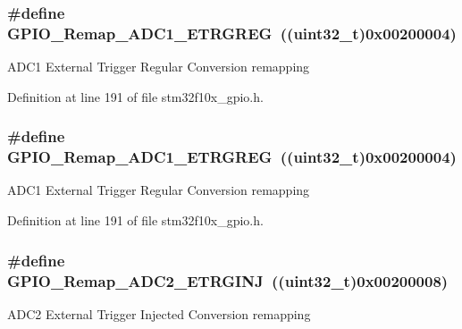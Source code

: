 \subsubsection[{\texorpdfstring{G\+P\+I\+O\+\_\+\+Remap\+\_\+\+A\+D\+C1\+\_\+\+E\+T\+R\+G\+R\+EG}{GPIO_Remap_ADC1_ETRGREG}}]{\setlength{\rightskip}{0pt plus 5cm}\#define G\+P\+I\+O\+\_\+\+Remap\+\_\+\+A\+D\+C1\+\_\+\+E\+T\+R\+G\+R\+EG~(({\bf uint32\+\_\+t})0x00200004)}\hypertarget{group___g_p_i_o___remap__define_gab1d040cab5d9f16f362edc2e8b47a82a}{}\label{group___g_p_i_o___remap__define_gab1d040cab5d9f16f362edc2e8b47a82a}
A\+D\+C1 External Trigger Regular Conversion remapping 

Definition at line 191 of file stm32f10x\+\_\+gpio.\+h.

\subsubsection[{\texorpdfstring{G\+P\+I\+O\+\_\+\+Remap\+\_\+\+A\+D\+C1\+\_\+\+E\+T\+R\+G\+R\+EG}{GPIO_Remap_ADC1_ETRGREG}}]{\setlength{\rightskip}{0pt plus 5cm}\#define G\+P\+I\+O\+\_\+\+Remap\+\_\+\+A\+D\+C1\+\_\+\+E\+T\+R\+G\+R\+EG~(({\bf uint32\+\_\+t})0x00200004)}\hypertarget{group___g_p_i_o___remap__define_gab1d040cab5d9f16f362edc2e8b47a82a}{}\label{group___g_p_i_o___remap__define_gab1d040cab5d9f16f362edc2e8b47a82a}
A\+D\+C1 External Trigger Regular Conversion remapping 

Definition at line 191 of file stm32f10x\+\_\+gpio.\+h.

\subsubsection[{\texorpdfstring{G\+P\+I\+O\+\_\+\+Remap\+\_\+\+A\+D\+C2\+\_\+\+E\+T\+R\+G\+I\+NJ}{GPIO_Remap_ADC2_ETRGINJ}}]{\setlength{\rightskip}{0pt plus 5cm}\#define G\+P\+I\+O\+\_\+\+Remap\+\_\+\+A\+D\+C2\+\_\+\+E\+T\+R\+G\+I\+NJ~(({\bf uint32\+\_\+t})0x00200008)}\hypertarget{group___g_p_i_o___remap__define_gae00aaabeed54e805932ec6978acf000d}{}\label{group___g_p_i_o___remap__define_gae00aaabeed54e805932ec6978acf000d}
A\+D\+C2 External Trigger Injected Conversion remapping 

